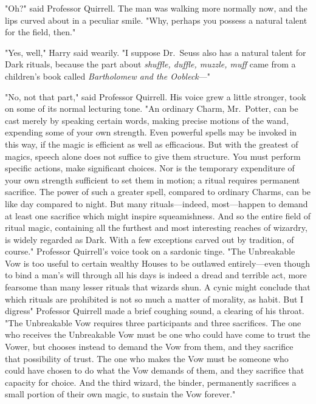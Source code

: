 "Oh?" said Professor Quirrell. The man was walking more normally now, and the
lips curved about in a peculiar smile. "Why, perhaps you possess a natural
talent for the field, then."

"Yes, well," Harry said wearily. "I suppose Dr.~Seuss also has a natural talent
for Dark rituals, because the part about \emph{shuffle, duffle, muzzle, muff}
came from a children's book called \emph{Bartholomew and the Oobleck}\mbox{---}"

"No, not that part," said Professor Quirrell. His voice grew a little stronger,
took on some of its normal lecturing tone. "An ordinary Charm, Mr.~Potter, can
be cast merely by speaking certain words, making precise motions of the wand,
expending some of your own strength. Even powerful spells may be invoked in
this way, if the magic is efficient as well as efficacious. But with the
greatest of magics, speech alone does not suffice to give them structure. You
must perform specific actions, make significant choices. Nor is the temporary
expenditure of your own strength sufficient to set them in motion; a ritual
requires permanent sacrifice. The power of such a greater spell, compared to
ordinary Charms, can be like day compared to night. But many rituals---indeed,
most---happen to demand at least one sacrifice which might inspire
squeamishness. And so the entire field of ritual magic, containing all the
furthest and most interesting reaches of wizardry, is widely regarded as Dark.
With a few exceptions carved out by tradition, of course." Professor Quirrell's
voice took on a sardonic tinge. "The Unbreakable Vow is too useful to certain
wealthy Houses to be outlawed entirely---even though to bind a man's will
through all his days is indeed a dread and terrible act, more fearsome than
many lesser rituals that wizards shun. A cynic might conclude that which
rituals are prohibited is not so much a matter of morality, as habit. But I
digress{\el}" Professor Quirrell made a brief coughing sound, a clearing of
his throat. "The Unbreakable Vow requires three participants and three
sacrifices. The one who receives the Unbreakable Vow must be one who could have
come to trust the Vower, but chooses instead to demand the Vow from them, and
they sacrifice that possibility of trust. The one who makes the Vow must be
someone who could have chosen to do what the Vow demands of them, and they
sacrifice that capacity for choice. And the third wizard, the binder,
permanently sacrifices a small portion of their own magic, to sustain the Vow
forever."

